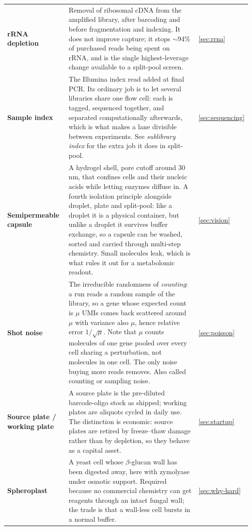 \begin{longtable}{@{}>{\raggedright\arraybackslash}p{}>{\raggedright\arraybackslash}p{}>{\raggedright\arraybackslash}p{}@{}}
\addlinespace[5pt]
\textbf{rRNA depletion} & Removal of ribosomal cDNA from the amplified library, after barcoding and before fragmentation and indexing. It does not improve capture; it stops $\sim$94\% of purchased reads being spent on rRNA, and is the single highest-leverage change available to a split-pool screen. & \cref{sec:rrna} \\
\addlinespace[5pt]
\textbf{Sample index} & The Illumina index read added at final PCR. Its ordinary job is to let several libraries share one flow cell: each is tagged, sequenced together, and separated computationally afterwards, which is what makes a lane divisible between experiments. See \emph{sublibrary index} for the extra job it does in split-pool. & \cref{sec:sequencing} \\
\addlinespace[5pt]
\textbf{Semipermeable capsule}\newline {\color{tcgray}(SPC)} & A hydrogel shell, pore cutoff around 30\,nm, that confines cells and their nucleic acids while letting enzymes diffuse in. A fourth isolation principle alongside droplet, plate and split-pool: like a droplet it is a physical container, but unlike a droplet it survives buffer exchange, so a capsule can be washed, sorted and carried through multi-step chemistry. Small molecules leak, which is what rules it out for a metabolomic readout. & \cref{sec:vision} \\
\addlinespace[5pt]
\textbf{Shot noise} & The irreducible randomness of \emph{counting}: a run reads a random sample of the library, so a gene whose expected count is $\mu$ UMIs comes back scattered around $\mu$ with variance also $\mu$, hence relative error $1/\sqrt{\mu}$. Note that $\mu$ counts molecules of one gene pooled over every cell sharing a perturbation, not molecules in one cell. The only noise buying more reads removes. Also called counting or sampling noise. & \cref{sec:poisson} \\
\addlinespace[5pt]
\textbf{Source plate / working plate} & A source plate is the pre-diluted barcode-oligo stock as shipped; working plates are aliquots cycled in daily use. The distinction is economic: source plates are retired by freeze--thaw damage rather than by depletion, so they behave as a capital asset. & \cref{sec:startup} \\
\addlinespace[5pt]
\textbf{Spheroplast} & A yeast cell whose $\beta$-glucan wall has been digested away, here with zymolyase under osmotic support. Required because no commercial chemistry can get reagents through an intact fungal wall; the trade is that a wall-less cell bursts in a normal buffer. & \cref{sec:why-hard} \\

\end{longtable}
